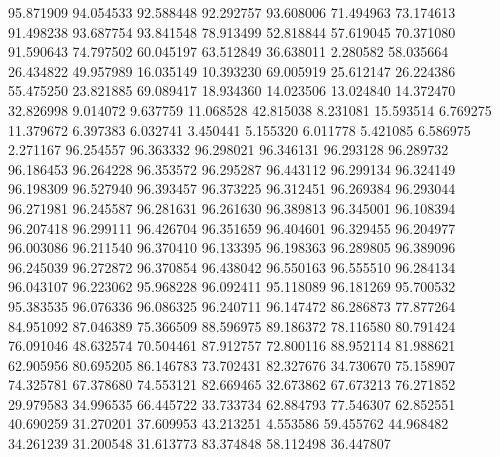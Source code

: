 95.871909
94.054533
92.588448
92.292757
93.608006
71.494963
73.174613
91.498238
93.687754
93.841548
78.913499
52.818844
57.619045
70.371080
91.590643
74.797502
60.045197
63.512849
36.638011
2.280582
58.035664
26.434822
49.957989
16.035149
10.393230
69.005919
25.612147
26.224386
55.475250
23.821885
69.089417
18.934360
14.023506
13.024840
14.372470
32.826998
9.014072
9.637759
11.068528
42.815038
8.231081
15.593514
6.769275
11.379672
6.397383
6.032741
3.450441
5.155320
6.011778
5.421085
6.586975
2.271167
96.254557
96.363332
96.298021
96.346131
96.293128
96.289732
96.186453
96.264228
96.353572
96.295287
96.443112
96.299134
96.324149
96.198309
96.527940
96.393457
96.373225
96.312451
96.269384
96.293044
96.271981
96.245587
96.281631
96.261630
96.389813
96.345001
96.108394
96.207418
96.299111
96.426704
96.351659
96.404601
96.329455
96.204977
96.003086
96.211540
96.370410
96.133395
96.198363
96.289805
96.389096
96.245039
96.272872
96.370854
96.438042
96.550163
96.555510
96.284134
96.043107
96.223062
95.968228
96.092411
95.118089
96.181269
95.700532
95.383535
96.076336
96.086325
96.240711
96.147472
86.286873
77.877264
84.951092
87.046389
75.366509
88.596975
89.186372
78.116580
80.791424
76.091046
48.632574
70.504461
87.912757
72.800116
88.952114
81.988621
62.905956
80.695205
86.146783
73.702431
82.327676
34.730670
75.158907
74.325781
67.378680
74.553121
82.669465
32.673862
67.673213
76.271852
29.979583
34.996535
66.445722
33.733734
62.884793
77.546307
62.852551
40.690259
31.270201
37.609953
43.213251
4.553586
59.455762
44.968482
34.261239
31.200548
31.613773
83.374848
58.112498
36.447807
